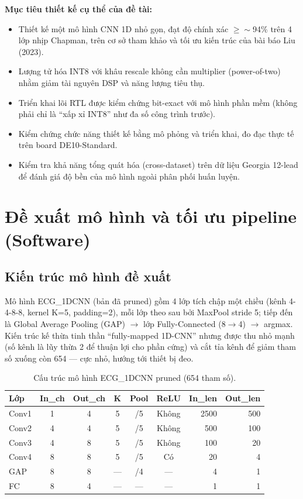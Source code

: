 \documentclass[12pt,a4paper]{article}
\begin{document}
\textbf{Mục tiêu thiết kế cụ thể của đề tài:}
\begin{itemize}
  \item Thiết kế một mô hình CNN 1D nhỏ gọn, đạt độ chính xác $\geq \sim$94\% trên 4 lớp nhịp
        Chapman, trên cơ sở tham khảo và tối ưu kiến trúc của bài báo Liu (2023).
  \item Lượng tử hóa INT8 với khâu rescale không cần multiplier (power-of-two) nhằm giảm tài
        nguyên DSP và năng lượng tiêu thụ.
  \item Triển khai lõi RTL được kiểm chứng bit-exact với mô hình phần mềm (không phải chỉ là
        ``xấp xỉ INT8'' như đa số công trình trước).
  \item Kiểm chứng chức năng thiết kế bằng mô phỏng và triển khai, đo đạc thực tế trên board
        DE10-Standard.
  \item Kiểm tra khả năng tổng quát hóa (cross-dataset) trên dữ liệu Georgia 12-lead để đánh
        giá độ bền của mô hình ngoài phân phối huấn luyện.
\end{itemize}

\section{Đề xuất mô hình và tối ưu pipeline (Software)}

\subsection{Kiến trúc mô hình đề xuất}

Mô hình ECG\_1DCNN (bản đã pruned) gồm 4 lớp tích chập một chiều (kênh 4-4-8-8, kernel K=5,
padding=2), mỗi lớp theo sau bởi MaxPool stride 5; tiếp đến là Global Average Pooling (GAP)
$\rightarrow$ lớp Fully-Connected (8$\rightarrow$4) $\rightarrow$ argmax. Kiến trúc kế thừa
tinh thần ``fully-mapped 1D-CNN'' nhưng được thu nhỏ mạnh (số kênh là lũy thừa 2 để thuận
lợi cho phần cứng) và cắt tỉa kênh để giảm tham số xuống còn 654 --- cực nhỏ, hướng tới
thiết bị đeo.

\begin{table}[h]
\centering
\caption{Cấu trúc mô hình ECG\_1DCNN pruned (654 tham số).}
\begin{tabular}{lcccccrr}
\toprule
\textbf{Lớp} & \textbf{In\_ch} & \textbf{Out\_ch} & \textbf{K} & \textbf{Pool} & \textbf{ReLU} & \textbf{In\_len} & \textbf{Out\_len}\\
\midrule
Conv1 & 1 & 4 & 5 & /5 & Không & 2500 & 500\\
Conv2 & 4 & 4 & 5 & /5 & Không & 500 & 100\\
Conv3 & 4 & 8 & 5 & /5 & Không & 100 & 20\\
Conv4 & 8 & 8 & 5 & /5 & Có & 20 & 4\\
GAP & 8 & 8 & --- & /4 & --- & 4 & 1\\
FC & 8 & 4 & --- & --- & --- & 1 & 1\\
\bottomrule
\end{tabular}
\end{table}
\end{document}

